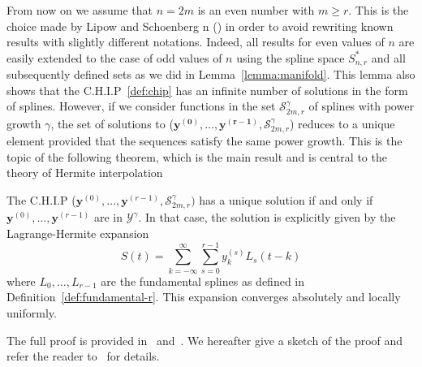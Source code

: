 From now on we assume that $n=2m$ is an even number with $m \geq r$. This is the choice made by Lipow and Schoenberg n 
(\cite{lipow_cardinal_1973}) in order to avoid rewriting known results with slightly different notations.  Indeed, all 
results for even values of $n$ are easily extended to the case of odd values of $n$ using the spline space $S_{n,r}^*$ 
and all subsequently defined sets as we did in Lemma~\ref{lemma:manifold}.  This lemma also shows that the 
C.H.I.P~\ref{def:chip} has an infinite number of solutions in the form of splines. However, if we consider functions in 
the set $\mathscr{S}_{2m,r}^{\gamma}$ of splines with power growth $\gamma$, the set of solutions to ($\bm{y^{(0)}}, 
\ldots, \bm{y^{(r-1)}}, \mathscr{S}_{2m,r}^{\gamma}$) reduces to a unique element provided that the sequences satisfy 
the same power growth. This is the topic of the following theorem, which is the main result and is central to the theory 
of Hermite interpolation

\begin{thm}\label{thm:LH-gamma}
  The C.H.I.P ($\bm{y}^{(0)}, \ldots, \bm{y}^{(r-1)}, \mathscr{S}_{2m,r}^{\gamma})$ has a unique solution if and only if 
  $\bm{y}^{(0)}, \ldots, \bm{y}^{(r-1)}$ are in  $\mathcal{Y}^{\gamma}$. In that case, the solution is explicitly given 
  by the Lagrange-Hermite expansion
  \begin{equation}\label{eq:LH}
    S(t) = \sum_{k=-\infty}^{\infty} \sum_{s=0}^{r-1} y_k^{(s)} L_s(t-k)
  \end{equation}
  where $L_0, \ldots, L_{r-1}$ are the fundamental splines as defined in Definition~\ref{def:fundamental-r}. This 
  expansion converges absolutely and locally uniformly.
\end{thm}
\noindent The full proof is provided in~\cite{lipow_cardinal_1973} and~\cite[Lecture 5]{schoenberg_cardinal_1973-1}. We 
hereafter give a sketch of the proof and refer the reader to~\cite{lipow_cardinal_1973} for details. 
  
